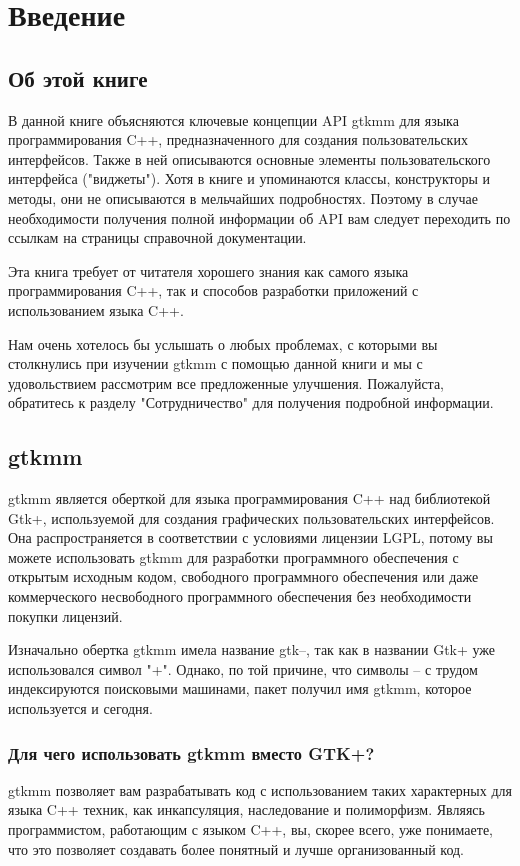 \chapter{Введение}
\section{Об этой книге}

 В данной книге объясняются ключевые концепции API gtkmm для языка программирования C++, предназначенного для создания пользовательских интерфейсов. Также в ней описываются основные элементы пользовательского интерфейса ("виджеты"). Хотя в книге и упоминаются классы, конструкторы и методы, они не описываются в мельчайших подробностях. Поэтому в случае необходимости получения полной информации об API вам следует переходить по ссылкам на страницы справочной документации.

Эта книга требует от читателя хорошего знания как самого языка программирования C++, так и способов разработки приложений с использованием языка C++.

Нам очень хотелось бы услышать о любых проблемах, с которыми вы столкнулись при изучении gtkmm с помощью данной книги и мы с удовольствием рассмотрим все предложенные улучшения. Пожалуйста, обратитесь к разделу "Сотрудничество" для получения подробной информации. 
\section{gtkmm}
 gtkmm является оберткой для языка программирования C++ над библиотекой Gtk+, используемой для создания графических пользовательских интерфейсов. Она распространяется в соответствии с условиями лицензии LGPL, потому вы можете использовать gtkmm для разработки программного обеспечения с открытым исходным кодом, свободного программного обеспечения или даже коммерческого несвободного программного обеспечения без необходимости покупки лицензий.

Изначально обертка gtkmm имела название gtk--, так как в названии Gtk+ уже использовался символ "+". Однако, по той причине, что символы -- с трудом индексируются поисковыми машинами, пакет получил имя gtkmm, которое используется и сегодня. 
\subsection{Для чего использовать gtkmm вместо GTK+?}
 gtkmm позволяет вам разрабатывать код с использованием таких характерных для языка C++ техник, как инкапсуляция, наследование и полиморфизм. Являясь программистом, работающим с языком C++, вы, скорее всего, уже понимаете, что это позволяет создавать более понятный и лучше организованный код.

